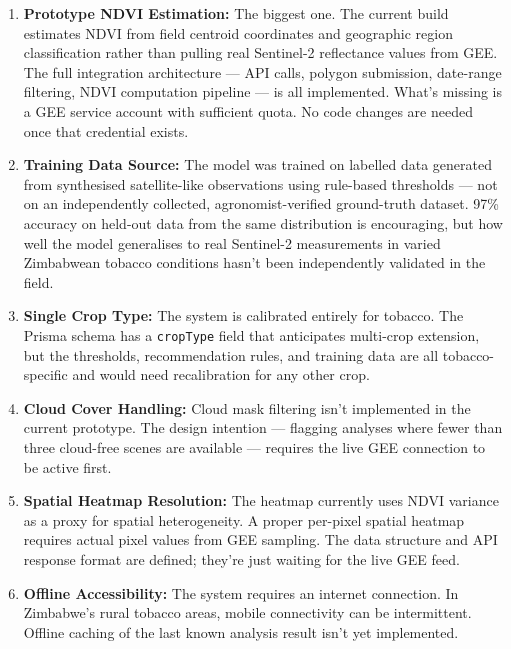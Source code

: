 \documentclass[12pt,a4paper]{report}
\begin{document}
\begin{enumerate}
  \item \textbf{Prototype NDVI Estimation:} The biggest one. The current build estimates NDVI from field centroid coordinates and geographic region classification rather than pulling real Sentinel-2 reflectance values from GEE. The full integration architecture — API calls, polygon submission, date-range filtering, NDVI computation pipeline — is all implemented. What's missing is a GEE service account with sufficient quota. No code changes are needed once that credential exists.

  \item \textbf{Training Data Source:} The model was trained on labelled data generated from synthesised satellite-like observations using rule-based thresholds — not on an independently collected, agronomist-verified ground-truth dataset. 97\% accuracy on held-out data from the same distribution is encouraging, but how well the model generalises to real Sentinel-2 measurements in varied Zimbabwean tobacco conditions hasn't been independently validated in the field.

  \item \textbf{Single Crop Type:} The system is calibrated entirely for tobacco. The Prisma schema has a \texttt{cropType} field that anticipates multi-crop extension, but the thresholds, recommendation rules, and training data are all tobacco-specific and would need recalibration for any other crop.

  \item \textbf{Cloud Cover Handling:} Cloud mask filtering isn't implemented in the current prototype. The design intention — flagging analyses where fewer than three cloud-free scenes are available — requires the live GEE connection to be active first.

  \item \textbf{Spatial Heatmap Resolution:} The heatmap currently uses NDVI variance as a proxy for spatial heterogeneity. A proper per-pixel spatial heatmap requires actual pixel values from GEE sampling. The data structure and API response format are defined; they're just waiting for the live GEE feed.

  \item \textbf{Offline Accessibility:} The system requires an internet connection. In Zimbabwe's rural tobacco areas, mobile connectivity can be intermittent. Offline caching of the last known analysis result isn't yet implemented.
\end{enumerate}
\end{document}
